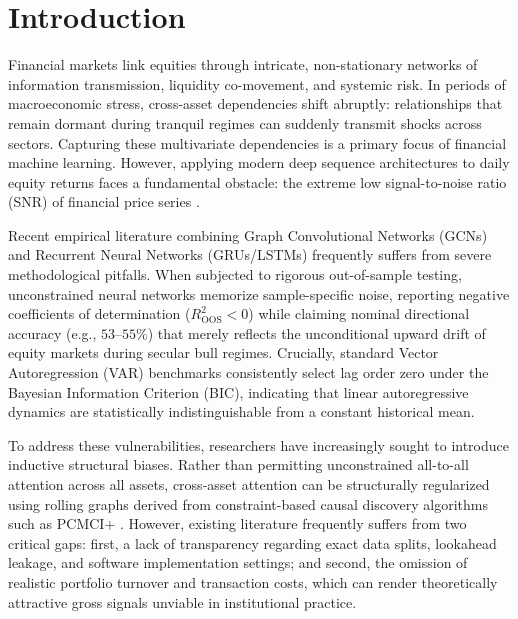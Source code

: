 \documentclass[10pt,twocolumn,a4paper]{article}
\begin{document}
\section{Introduction}
Financial markets link equities through intricate, non-stationary networks of information transmission, liquidity co-movement, and systemic risk. In periods of macroeconomic stress, cross-asset dependencies shift abruptly: relationships that remain dormant during tranquil regimes can suddenly transmit shocks across sectors. Capturing these multivariate dependencies is a primary focus of financial machine learning. However, applying modern deep sequence architectures to daily equity returns faces a fundamental obstacle: the extreme low signal-to-noise ratio (SNR) of financial price series \cite{campbell2008,welch2008}.

Recent empirical literature combining Graph Convolutional Networks (GCNs) and Recurrent Neural Networks (GRUs/LSTMs) frequently suffers from severe methodological pitfalls. When subjected to rigorous out-of-sample testing, unconstrained neural networks memorize sample-specific noise, reporting negative coefficients of determination ($R^2_{\mathrm{OOS}} < 0$) while claiming nominal directional accuracy (e.g., $53\text{--}55\%$) that merely reflects the unconditional upward drift of equity markets during secular bull regimes. Crucially, standard Vector Autoregression (VAR) benchmarks consistently select lag order zero under the Bayesian Information Criterion (BIC), indicating that linear autoregressive dynamics are statistically indistinguishable from a constant historical mean.

To address these vulnerabilities, researchers have increasingly sought to introduce inductive structural biases. Rather than permitting unconstrained all-to-all attention across all assets, cross-asset attention can be structurally regularized using rolling graphs derived from constraint-based causal discovery algorithms such as PCMCI+ \cite{runge2020}. However, existing literature frequently suffers from two critical gaps: first, a lack of transparency regarding exact data splits, lookahead leakage, and software implementation settings; and second, the omission of realistic portfolio turnover and transaction costs, which can render theoretically attractive gross signals unviable in institutional practice.
\end{document}

